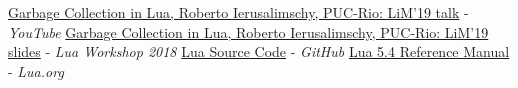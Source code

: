 \documentclass[10pt]{article}
\renewcommand{\normalsize}{\small}
\begin{document}
\begin{thebibliography}{9}
    \href{https://youtu.be/wGizKsOJQuE?si=Lj0cwnB4bItl0ssn} {Garbage Collection in Lua, Roberto Ierusalimschy, PUC-Rio: LiM'19 talk} - \textit{YouTube}
    \href{https://www.lua.org/wshop18/Ierusalimschy.pdf} {Garbage Collection in Lua, Roberto Ierusalimschy, PUC-Rio: LiM'19 slides} - \textit{Lua Workshop 2018}
    \href{https://www.github.com/lua/lua} {Lua Source Code} - \textit{GitHub}
    \href{https://www.lua.org/manual/5.4/manual.html#2.5} {Lua 5.4 Reference Manual} - \textit{Lua.org}
\end{thebibliography}



\let\Huge=\huge
\let\huge=\LARGE
\let\LARGE=\Large
\let\Large=\large
\let\large=\normalsize
\let\normalsize=\small
\let\small=\tiny
\let\footnotesize=\small
\let\scriptsize=\small
\let\Huge=\huge
\let\huge=\LARGE
\let\Large=\large
\let\large=\normalsize
\let\normalsize=\small
\let\small=\footnotesize
\let\footnotesize=\scriptsize
\let\scriptsize=\tiny


\appendixtitleon
\appendixtitletocon
\end{document}
